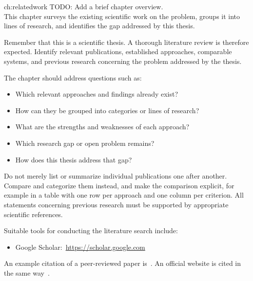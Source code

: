 \ThesisChapter
  {}
  {ch:relatedwork}
  {TODO: Add a brief chapter overview. \\
  This chapter surveys the existing scientific work on the problem, groups it into lines of research, and identifies the gap addressed by this thesis.}


Remember that this is a scientific thesis.
A thorough literature review is therefore expected.
Identify relevant publications, established approaches, comparable systems, and previous research concerning the problem addressed by the thesis.

The chapter should address questions such as:

\begin{itemize}
  \item Which relevant approaches and findings already exist?
  \item How can they be grouped into categories or lines of research?
  \item What are the strengths and weaknesses of each approach?
  \item Which research gap or open problem remains?
  \item  How does this thesis address that gap?
\end{itemize}

Do not merely list or summarize individual publications one after another.
Compare and categorize them instead, and make the comparison explicit, for example in a table with one row per approach and one column per criterion.
All statements concerning previous research must be supported by appropriate scientific references.


Suitable tools for conducting the literature search include:
\begin{itemize}
  \item Google Scholar:~\url{https://scholar.google.com}
\end{itemize}

An example citation of a peer-reviewed paper is~\cite{lozi2016LinuxScheduler}.
An official website is cited in the same way~\cite{schedmdSlurmOverview}.
